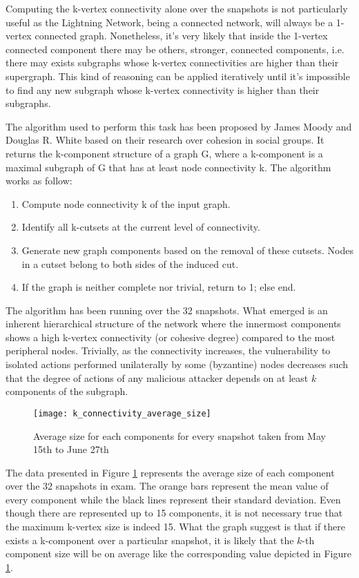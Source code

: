 	Computing the k-vertex connectivity alone over the snapshots is not particularly useful as the Lightning Network, being a connected network, will always be a 1-vertex connected graph. Nonetheless, it's very likely that inside the 1-vertex connected component there may be others, stronger, connected components, i.e. there may exists subgraphs whose k-vertex connectivities are higher than their supergraph. This kind of reasoning can be applied iteratively until it's impossible to find any new subgraph whose k-vertex connectivity is higher than their subgraphs.
	
	The algorithm used to perform this task has been proposed by James Moody and Douglas R. White \cite{Moody2003} based on their research over cohesion in social groups. It returns the k-component structure of a graph G, where a k-component is a maximal subgraph of G that has at least node connectivity k. The algorithm works as follow:
	\begin{enumerate}
		\item Compute node connectivity k of the input graph.
		\item Identify all k-cutsets at the current level of connectivity. 
		\item Generate new graph components based on the removal of these cutsets. Nodes in a cutset belong to both sides of the induced cut.
		\item If the graph is neither complete nor trivial, return to 1; else end.
	\end{enumerate}
	
	The algorithm has been running over the 32 snapshots. What emerged is an inherent hierarchical structure of the network where the innermost components shows a high k-vertex connectivity (or cohesive degree) compared to the most peripheral nodes. Trivially, as the connectivity increases, the vulnerability to isolated actions performed unilaterally by some (byzantine) nodes decreases such that the degree of actions of any malicious attacker depends on at least $k$ components of the subgraph.
	
	\begin{figure}
		\texttt{[image: k\_connectivity\_average\_size]}\\
		\caption{Average size for each components for every snapshot taken from May 15th to June 27th}
		\label{monthly_connectivity_average}
	\end{figure}
	
	The data presented in Figure \ref{monthly_connectivity_average} represents the average size of each component over the 32 snapshots in exam. The orange bars represent the mean value of every component while the black lines represent their standard deviation. Even though there are represented up to 15 components, it is not necessary true that the maximum k-vertex size is indeed 15. What the graph suggest is that if there exists a k-component over a particular snapshot, it is likely that the $k$-th component size will be on average like the corresponding value depicted in Figure \ref{monthly_connectivity_average}.
	
